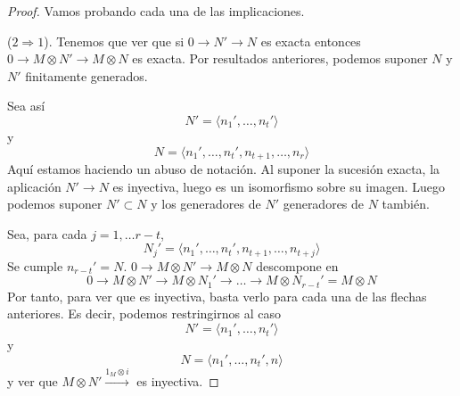 \documentclass[../main.tex]{subfiles}
\begin{document}
\begin{proof} Vamos probando cada una de las implicaciones.

	($2\Rightarrow1$). Tenemos que ver que si $0\rightarrow N'\rightarrow N$ es exacta entonces $0\rightarrow M\otimes N'\rightarrow M\otimes N$ es exacta. Por resultados anteriores, podemos suponer $N$ y $N'$ finitamente generados.

	Sea así $$N'=\langle n_1',\dots,n_t'\rangle$$ y $$N=\langle n_1',\dots,n_t',n_{t+1},\dots,n_r\rangle$$ Aquí estamos haciendo un abuso de notación. Al suponer la sucesión exacta, la aplicación $N'\rightarrow N$ es inyectiva, luego es un isomorfismo sobre su imagen. Luego podemos suponer $N'\subset N$ y los generadores de $N'$ generadores de $N$ también.

	Sea, para cada $j=1,\dots r-t$, $$N_j'=\langle n_1',\dots,n_t',n_{t+1},\dots,n_{t+j}\rangle$$ Se cumple $n_{r-t}'=N$. $0\rightarrow M\otimes N'\rightarrow M\otimes N$ descompone en $$0\longrightarrow M\otimes N'\longrightarrow M\otimes  N_1'\longrightarrow\dots\longrightarrow M\otimes N_{r-t}'=M\otimes N$$ Por tanto, para ver que es inyectiva, basta verlo para cada una de las flechas anteriores. Es decir, podemos restringirnos al caso $$N'=\langle n_1',\dots,n_t'\rangle$$ y $$N=\langle n_1',\dots,n_t',n\rangle$$ y ver que $M\otimes N'\overset{1_M\otimes i}{\longrightarrow}$ es inyectiva.


\end{proof}
\end{document}
